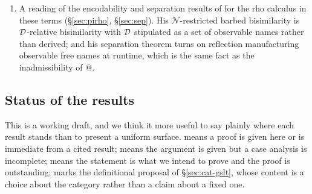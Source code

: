 \documentclass{article}
\begin{document}
\begin{enumerate}
    \item A reading of the encodability and separation results of \citet{lybech} for the rho calculus in these terms (\S\ref{sec:pirho}, \S\ref{sec:sep}). His $\mathcal{N}$-restricted barbed bisimilarity is $\mathcal{D}$-relative bisimilarity with $\mathcal{D}$ stipulated as a set of observable names rather than derived; and his separation theorem turns on reflection manufacturing observable free names at runtime, which is the same fact as the inadmissibility of $@$.
\end{enumerate}

\subsection{Status of the results}

This is a working draft, and we think it more useful to say plainly where each result stands than to present a uniform surface. \stProved{} means a proof is given here or is immediate from a cited result; \stSketch{} means the argument is given but a case analysis is incomplete; \stOblig{} means the statement is what we intend to prove and the proof is outstanding; \stProposal{} marks the definitional proposal of \S\ref{sec:cat-gslt}, whose content is a choice about the category rather than a claim about a fixed one.
\end{document}
